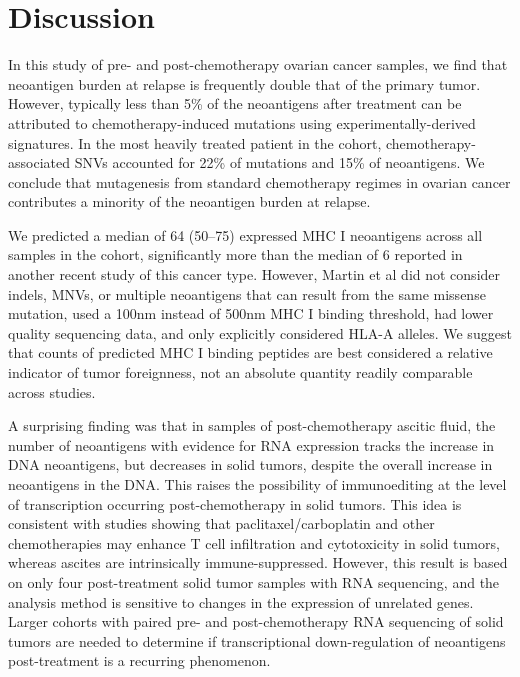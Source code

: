 \section*{Discussion}

In this study of pre- and post-chemotherapy ovarian cancer samples, we find that neoantigen burden at relapse is frequently double that of the primary tumor. However, typically less than 5\% of the neoantigens after treatment can be attributed to chemotherapy-induced mutations using experimentally-derived signatures. In the most heavily treated patient in the cohort, chemotherapy-associated SNVs accounted for 22\% of mutations and 15\% of neoantigens. We conclude that mutagenesis from standard chemotherapy regimes in ovarian cancer contributes a minority of the neoantigen burden at relapse.


We predicted a median of 64 (50--75) expressed MHC I neoantigens across all samples in the cohort, significantly more than the median of 6 reported in another recent study of this cancer type\cite{Martin_2016}. However, Martin et al did not consider indels, MNVs, or multiple neoantigens that can result from the same missense mutation, used a 100nm instead of 500nm MHC I binding threshold, had lower quality sequencing data, and only explicitly considered HLA-A alleles. We suggest that counts of predicted MHC I binding peptides are best considered a relative indicator of tumor foreignness, not an absolute quantity readily comparable across studies.

A surprising finding was that in samples of post-chemotherapy ascitic fluid, the number of neoantigens with evidence for RNA expression tracks the increase in DNA neoantigens, but decreases in solid tumors, despite the overall increase in neoantigens in the DNA. This raises the possibility of immunoediting\cite{Dunn_2002} at the level of transcription occurring post-chemotherapy in solid tumors. This idea is consistent with studies showing that paclitaxel/carboplatin and other chemotherapies may enhance T cell infiltration and cytotoxicity in solid tumors\cite{Demaria2001,Wu_2009,Pfannenstiel_2010,Hodge_2013}, whereas ascites are intrinsically immune-suppressed\cite{Giuntoli2009,Simpson-Abelson2013,Singel2016}. However, this result is based on only four post-treatment solid tumor samples with RNA sequencing, and the analysis method is sensitive to changes in the expression of unrelated genes. Larger cohorts with paired pre- and post-chemotherapy RNA sequencing of solid tumors are needed to determine if transcriptional down-regulation of neoantigens post-treatment is a recurring phenomenon.

